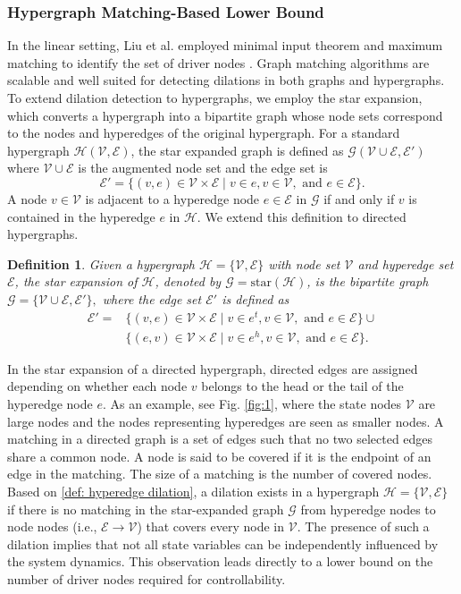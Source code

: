 \documentclass[journal,twoside,web]{ieeecolor}
\newtheorem{definition}{Definition}
\newcommand{\Es}{\mathcal{E}}
\newcommand{\Gs}{\mathcal{G}}
\newcommand{\Hs}{\mathcal{H}}
\newcommand{\Vs}{\mathcal{V}}
\begin{document}
\subsubsection{Hypergraph Matching-Based Lower Bound}
In the linear setting, Liu et al. employed minimal input theorem and maximum matching to identify the set of driver nodes \cite{liu2011controllability}. Graph matching algorithms are scalable and well suited for detecting dilations in both graphs and hypergraphs. To extend dilation detection to hypergraphs, we employ the star expansion, which converts a hypergraph into a bipartite graph whose node sets correspond to the nodes and hyperedges of the original hypergraph. For a standard hypergraph $\Hs(\Vs, \Es)$, the star expanded graph is defined as $\Gs(\Vs\cup\Es,\Es')$ where $\Vs\cup\Es$ is the augmented node set and the edge set is
\[
\Es' = \{ (v,e) \in \Vs \times \Es \mid v \in e, v\in \Vs, \text{ and }e\in\Es \}.
\]
A node $v \in \Vs$ is adjacent to a hyperedge node $e \in \Es$ in $\Gs$ if and only if $v$ is contained in the hyperedge $e$ in $\Hs$. We extend this definition to directed hypergraphs.

\begin{definition}
Given a hypergraph $\Hs=\{\Vs, \Es\}$ with node set $\Vs$ and hyperedge set $\Es$, the star expansion of $\Hs$, denoted by $\Gs = \mathrm{star}(\Hs)$, is the bipartite graph
    $\Gs = \{\Vs \cup \Es, \Es'\},$
where the edge set $\Es'$ is defined as
\begin{equation*}
\begin{split}
    \Es' = & \{ (v,e) \in \Vs \times \Es \mid v \in e^t, v\in \Vs, \text{ and }e\in\Es \} \cup\\
    & \{ (e,v) \in \Vs \times \Es \mid v \in e^h, v\in \Vs, \text{ and }e\in\Es \}.
\end{split}
\end{equation*}
\text{ }
\end{definition}

In the star expansion of a directed hypergraph, directed edges are assigned depending on whether each node $v$ belongs to the head or the tail of the hyperedge node $e$.
%
As an example, see Fig. \ref{fig:1}, where the state nodes $\Vs$ are large nodes and the nodes representing hyperedges are seen as smaller nodes. A matching in a directed graph is a set of edges such that no two selected edges share a common node. A node is said to be covered if it is the endpoint of an edge in the matching. The size of a matching is the number of covered nodes.
%
Based on \cref{def: hyperedge dilation}, a dilation exists in a hypergraph $\Hs=\{\Vs, \Es\}$ if there is no matching in the star-expanded graph $\Gs$ from hyperedge nodes to node nodes (i.e., $\Es \to \Vs$) that covers every node in $\Vs$. The presence of such a dilation implies that not all state variables can be independently influenced by the system dynamics.
%
This observation leads directly to a lower bound on the number of driver nodes required for controllability.
\end{document}

